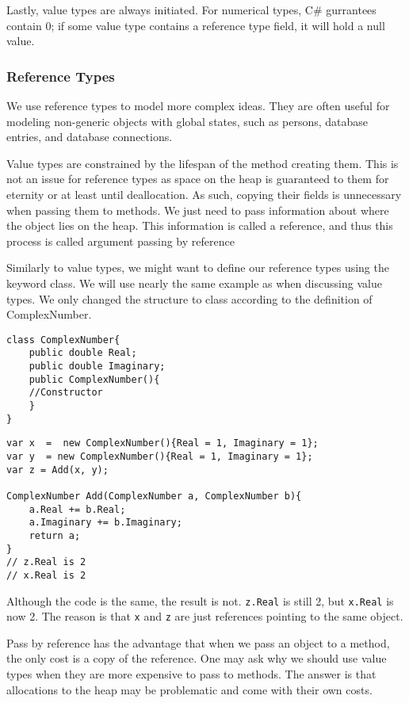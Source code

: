 Lastly, value types are always initiated. For numerical types, C\# gurrantees contain 0; if some value type contains a reference type field, it will hold a null value.

\subsubsection{Reference Types}
We use reference types to model more complex ideas. They are often useful for modeling non-generic objects with global states, such as persons, database entries, and database connections. 

Value types are constrained by the lifespan of the method creating them. This is not an issue for reference types as
space on the heap is guaranteed to them for eternity or at least until deallocation.
As such, copying their fields is unnecessary when passing them to methods. We just need to pass information about where the object lies on the heap. This information is called a reference, and thus this process is called argument passing by reference

Similarly to value types, we might want to define our reference types using the keyword class. We will use nearly the same example as when discussing value types. We only changed the structure to class according to the definition of ComplexNumber.

\begin{lstlisting}
class ComplexNumber{
    public double Real;
    public double Imaginary;
    public ComplexNumber(){
    //Constructor
    }
}
\end{lstlisting}
\begin{lstlisting}
var x  =  new ComplexNumber(){Real = 1, Imaginary = 1};
var y  = new ComplexNumber(){Real = 1, Imaginary = 1};
var z = Add(x, y);

ComplexNumber Add(ComplexNumber a, ComplexNumber b){
    a.Real += b.Real;
    a.Imaginary += b.Imaginary;
    return a;
}
// z.Real is 2
// x.Real is 2
\end{lstlisting}
Although the code is the same, the result is not. \texttt{z.Real} is still 2, but \texttt{x.Real} is now 2. The reason is that \texttt{x} and \texttt{z} are just references pointing to the same object.

Pass by reference has the advantage that when we pass an object to a method, the only cost is a copy of the reference. One may ask why we should use value types when they are more expensive to pass to methods. The answer is that allocations to the heap may be problematic and come with their own costs.

